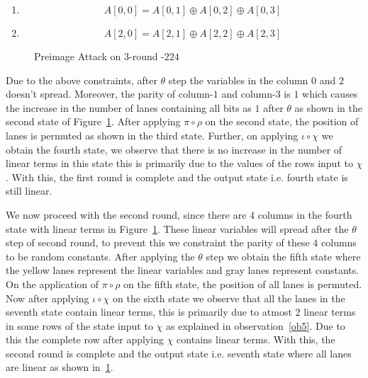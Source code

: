 \begin{enumerate}
	\item \[
	A[0,0] = A[0,1] \oplus A[0,2] \oplus A[0, 3]
	\]
	\item \[
	A[2,0] = A[2,1] \oplus A[2,2] \oplus A[2,3]
	\]
\end{enumerate}

\begin{figure}[H]
	\caption{Preimage Attack on 3-round \KECCAK-$224$}
	\label{fig:3rkeccak224}
\end{figure}

Due to the above constraints, after $\theta$ step the variables in the column $0$ and $2$ doesn't spread. Moreover, the parity of column-$1$ and column-$3$ is $1$ which causes the increase in the number of lanes containing all bits as $1$ after $\theta$ as shown in the second state of Figure~\ref{fig:3rkeccak224}. After applying $\pi \circ \rho$ on the second state, the position of lanes is permuted as shown in the third state. Further, on applying $\iota \circ \chi$ we obtain the fourth state, we observe that there is no increase in the number of linear terms in this state this is primarily due to the values of the rows input to $\chi$. With this, the first round is complete and the output state i.e. fourth state is still linear.

We now proceed with the second round, since there are $4$ columns in the fourth state with linear terms in Figure~\ref{fig:3rkeccak224}. These linear variables will spread after the $\theta$ step of second round, to prevent this we constraint the parity of these $4$ columns to be random constants. After applying the $\theta$ step we obtain the fifth state where the yellow lanes represent the linear variables and gray lanes represent constants. On the application of $\pi \circ \rho$ on the fifth state, the position of all lanes is permuted. Now after applying $\iota \circ \chi$ on the sixth state we observe that all the lanes in the seventh state contain linear terms, this is primarily due to atmost 2 linear terms in some rows of the state input to $\chi$ as explained in observation~\ref{ob5}. Due to this the complete row after applying $\chi$ contains linear terms. With this, the second round is complete and the output state i.e. seventh state where all lanes are linear as shown in~\ref{fig:3rkeccak224}.

